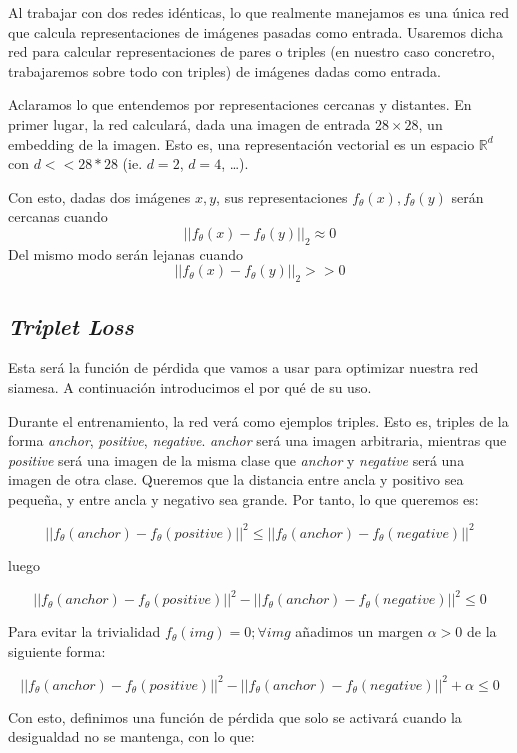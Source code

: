 \documentclass[11pt]{article}
\begin{document}
Al trabajar con dos redes idénticas, lo que realmente manejamos es una única red que calcula representaciones de imágenes pasadas como entrada. Usaremos dicha red para calcular representaciones de pares o triples (en nuestro caso concretro, trabajaremos sobre todo con triples) de imágenes dadas como entrada.

Aclaramos lo que entendemos por representaciones cercanas y distantes. En primer lugar, la red calculará, dada una imagen de entrada $28\times28$, un embedding de la imagen. Esto es, una representación vectorial es un espacio $\mathbb{R}^d$ con $d << 28*28$ (ie. $d = 2$, $d = 4$, \ldots).

Con esto, dadas dos imágenes $x, y$, sus representaciones $ f_{\theta}(x),  f_{\theta}(y)$ serán cercanas cuando $$|| f_{\theta}(x) - f_{\theta}(y)||_2 \approx 0$$ Del mismo modo serán lejanas cuando $$|| f_{\theta}(x) - f_{\theta}(y)||_2 >> 0$$

\pagebreak
\subsection{\emph{Triplet Loss}}

Esta será la función de pérdida que vamos a usar para optimizar nuestra red siamesa. A continuación introducimos el por qué de su uso.

Durante el entrenamiento, la red verá como ejemplos triples. Esto es, triples de la forma \emph{anchor}, \emph{positive}, \emph{negative}. \emph{anchor} será una imagen arbitraria, mientras que \emph{positive} será una imagen de la misma clase que \emph{anchor} y \emph{negative} será una imagen de otra clase. Queremos que la distancia entre ancla y positivo sea pequeña, y entre ancla y negativo sea grande. Por tanto, lo que queremos es:

$$||f_{\theta}(anchor) - f_{\theta}(positive)||^2 \leq ||f_{\theta}(anchor) - f_{\theta}(negative)||^2 $$

luego

$$||f_{\theta}(anchor) - f_{\theta}(positive)||^2 - ||f_{\theta}(anchor) - f_{\theta}(negative)||^2 \leq 0$$

Para evitar la trivialidad $f_{\theta}(img) = 0; \forall img$ añadimos un margen $\alpha > 0$ de la siguiente forma:

$$||f_{\theta}(anchor) - f_{\theta}(positive)||^2 - ||f_{\theta}(anchor) - f_{\theta}(negative)||^2 + \alpha \leq 0$$

Con esto, definimos una función de pérdida que solo se activará cuando la desigualdad no se mantenga, con lo que:
\end{document}
